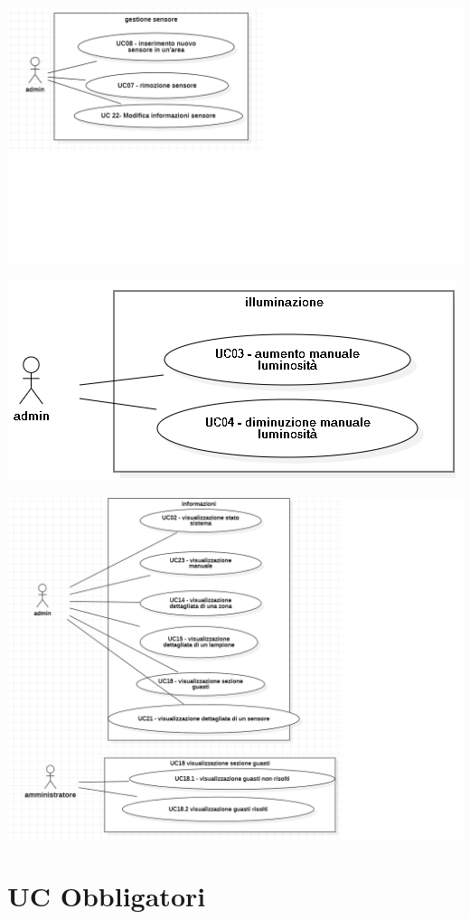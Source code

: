 \documentclass[12pt]{article}
\begin{document}
\includegraphics[scale=0.5]{gestione sensore.png}	

\includegraphics[scale=0.5]{illuminazione.png}	

\includegraphics[scale=0.5]{informazioni.png}	

\pagebreak
\section{UC Obbligatori}
\end{document}
